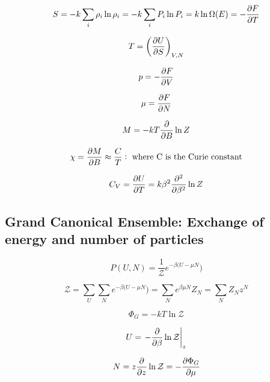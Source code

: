 \documentclass{article}
\begin{document}
\begin{equation}
	S=-k\sum_i \rho_i \ln \rho_i=-k\sum_i P_i \ln P_i=k\ln\Omega(E)=-\pdv{F}{T}
\end{equation}

\begin{equation}
	T=\left(\pdv{U}{S}\right)_{V, N}
\end{equation}

\begin{equation}
	p=-\pdv{F}{V}
\end{equation}

\begin{equation}
	\mu=\pdv{F}{N}
\end{equation}

\begin{equation}
	M=-kT\pdv{B}\ln Z
\end{equation}

\begin{equation}
	\chi=\pdv{M}{B}\approx\frac{C}{T}:\text{   where C is the Curie constant}
\end{equation}

\begin{equation}
	C_V=\pdv{U}{T}=k\beta ^2\pdv[2]{\beta}\ln Z
\end{equation}

\subsection{Grand Canonical Ensemble: \normalfont Exchange of energy and number of particles}

\begin{equation}
	P(U,N)=\frac{1}{\mathcal{Z}}e^{-\beta(U-\mu N})
\end{equation}

\begin{equation}
	\mathcal{Z}=\sum_U \sum_N e^{-\beta(U-\mu N})=\sum_N e^{\beta\mu N}Z_N=\sum_N Z_Nz^N
\end{equation}

\begin{equation}
	\Phi_G=-kT\ln\mathcal{Z}
\end{equation}

\begin{equation}
	U=\left.-\pdv{\beta}\ln\mathcal{Z}\right\rvert_z
\end{equation}

\begin{equation}
	N=z\pdv{z}\ln\mathcal{Z}=-\pdv{\Phi_G}{\mu}
\end{equation}
\end{document}
